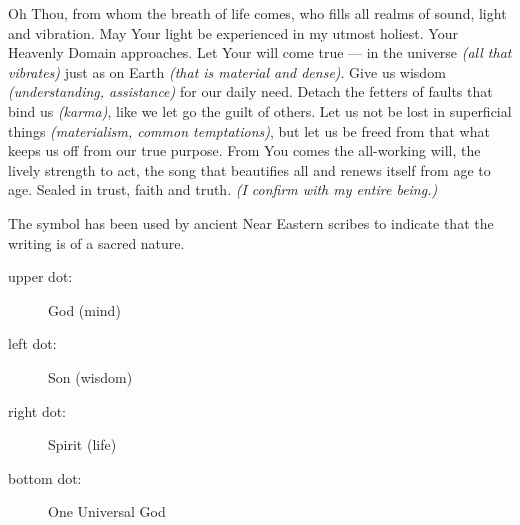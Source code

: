   \begin{translation}[EN]\justifycenter
    \vspace{-2em} %
    Oh Thou, from whom the breath of life comes,
    who fills all realms of sound, light and vibration.
    \vspace{1em} %
    May Your light be experienced in my utmost holiest.
    \vspace{1.5em} %
    Your Heavenly Domain approaches.
    \vspace{0.5em} %
    Let Your will come true --- in the universe \emph{(all that vibrates)}
    just as on Earth \emph{(that is material and dense)}.
    \vspace{0.5em} %
    Give us wisdom \emph{(understanding, assistance)}
    for our daily need.
    \vspace{0.5em} %
    Detach the fetters of faults that bind us \emph{(karma)},
    like we let go the guilt of others.
    \vspace{1em} %
    Let us not be lost in superficial things
    \emph{(materialism, common temptations)},
    \vspace{0.5em} %
    but let us be freed from that what keeps us off from
    our true purpose.
    \vspace{0.5em} %
    From You comes the all-working will, the lively strength to act,
    the song that beautifies all and renews itself from age to age.
    \vspace{1em} %
    Sealed in trust, faith and truth.
    \emph{(I confirm with my entire being.)}
  \end{translation}
  \begin{explanation}[EN]
    The symbol has been used by ancient Near Eastern scribes to indicate that
    the writing is of a sacred nature.
    \begin{description}
      \item[upper dot:] God (mind)
      \item[left dot:] Son (wisdom)
      \item[right dot:] Spirit (life)
      \item[bottom dot:] One Universal God
    \end{description}
  \end{explanation}
\endsong


